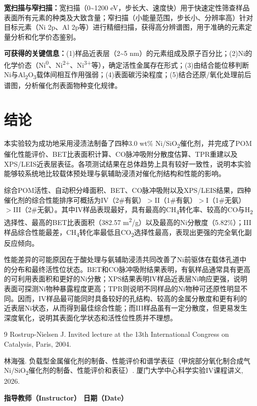 \documentclass[a4paper]{article}
\newcommand{\zihaoWu}{\fontsize{10.5pt}{16pt}\selectfont}
\begin{document}
\textbf{宽扫描与窄扫描：}宽扫描（0\textasciitilde{}1200 eV，步长大、速度快）用于快速定性筛查样品表面所有元素的种类及大致含量；窄扫描（小能量范围，步长小、分辨率高）针对目标元素（Ni 2p、Al 2p等）进行精细扫描，获得高分辨谱图，用于准确的元素定量分析和化学价态鉴别。

\textbf{可获得的关键信息：}(1)样品近表层（2\textasciitilde{}5 nm）的元素组成及原子百分比；(2)Ni的化学价态（Ni\textsuperscript{0}、Ni\textsuperscript{2+}、Ni\textsuperscript{3+}等），确定活性金属存在形式；(3)由结合能位移判断Ni与Al\textsubscript{2}O\textsubscript{3}载体间相互作用强弱；(4)表面碳污染程度；(5)结合还原/氧化处理前后谱图，分析催化剂表面物种变化规律。


\section{结论} \vspace{-0.5em}

本实验较为成功地采用浸渍法制备了四种3.0 wt\% Ni/SiO\textsubscript{2}催化剂，并完成了POM催化性能评价、BET比表面积计算、CO脉冲吸附分散度估算、TPR重建以及XPS/LEIS近表层表征。各项测试结果在总体趋势上具有较好一致性，说明本实验能够较系统地比较载体预处理与氨辅助浸渍对催化剂结构和性能的影响。

综合POM活性、自动积分峰面积、BET、CO脉冲吸附以及XPS/LEIS结果，四种催化剂的综合性能排序可概括为IV（2\#有氨）$>$II（1\#有氨）$>$I（1\#无氨）$>$III（2\#无氨）。其中IV样品表现最好，具有最高的CH\textsubscript{4}转化率、较高的CO与H\textsubscript{2}选择性、最高的BET比表面积（382.57 m\textsuperscript{2}/g）以及最高的Ni分散度（5.82\%）；III样品综合性能最差，CH\textsubscript{4}转化率最低且CO\textsubscript{2}选择性最高，表现出更强的完全氧化副反应倾向。

性能差异的可能原因在于酸处理与氨辅助浸渍共同改善了Ni前驱体在载体孔道中的分布和最终活性位状态。BET和CO脉冲吸附结果表明，有氨样品通常具有更高的可利用表面积和更好的Ni分散；XPS结果表明IV样品近表层Ni响应更强，说明表面可探测Ni物种暴露程度更高；TPR则说明不同样品的Ni物种可还原性明显不同。因而，IV样品最可能同时具备较好的孔结构、较高的金属分散度和更有利的近表层Ni状态，从而得到最佳综合性能；而III样品虽有一定分散度，但更易发生深度氧化，说明其表面化学状态和活性位性质并不理想。

{\footnotesize
{}
\begin{thebibliography}{9}
	Rostrup-Nielsen J.
	Invited lecture at the 13th International Congress on Catalysis, Paris, 2004.

	林海强.
	{负载型金属催化剂的制备、性能评价和谱学表征（甲烷部分氧化制合成气Ni/SiO\textsubscript{2}催化剂的制备、性能评价和表征）}.
	厦门大学中心科学实验IV课程讲义, 2026.

\end{thebibliography}
}

\vspace*{\fill}
\noindent{\zihaoWu 评语（Remarks）：}

\vspace{2em}

\begin{center}
	{\zihaoWu\bfseries 指导教师（Instructor）\hspace{8em} 日期（Date）}
\end{center}

\vspace{1.5cm}
\end{document}
